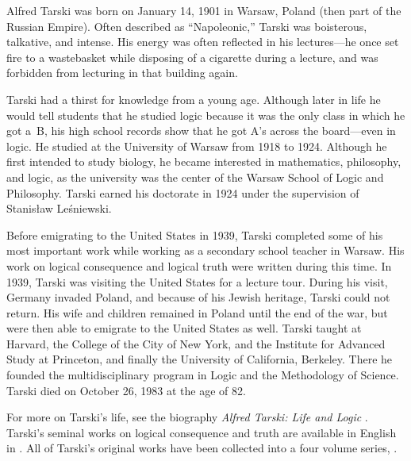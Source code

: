 \documentclass[../../../include/open-logic-section]{subfiles}
\begin{document}



Alfred Tarski was born on January 14, 1901 in Warsaw, Poland (then
part of the Russian Empire). Often described as ``Napoleonic,'' Tarski
was boisterous, talkative, and intense.  His energy was often reflected
in his lectures---he once set fire to a wastebasket while disposing of
a cigarette during a lecture, and was forbidden from lecturing in that
building again.

Tarski had a thirst for knowledge from a young age. Although later in
life he would tell students that he studied logic because it was the
only class in which he got a~B, his high school records show that he
got A's across the board---even in logic. He studied at the University
of Warsaw from 1918 to 1924. Although he first intended to study
biology, he became interested in mathematics, philosophy, and logic,
as the university was the center of the Warsaw School of Logic and
Philosophy. Tarski earned his doctorate in 1924 under the supervision of
Stanis\l{}aw Le\'{s}niewski.

Before emigrating to the United States in 1939, Tarski completed some
of his most important work while working as a secondary school teacher
in Warsaw. His work on logical consequence and logical truth were
written during this time. In 1939, Tarski was visiting the United
States for a lecture tour. During his visit, Germany invaded Poland,
and because of his Jewish heritage, Tarski could not return.  His wife
and children remained in Poland until the end of the war, but were
then able to emigrate to the United States as well.  Tarski taught at
Harvard, the College of the City of New York, and the Institute for
Advanced Study at Princeton, and finally the University of California,
Berkeley. There he founded the multidisciplinary program in Logic and
the Methodology of Science.  Tarski died on October 26, 1983 at the
age of 82.

\begin{reading} 
For more on Tarski's life, see the biography \emph{Alfred Tarski: Life
  and Logic} \citep{Feferman2004}. Tarski's seminal works on logical
consequence and truth are available in English in \citet{Tarski1983}.
All of Tarski's original works have been collected into a four volume
series, \citet{Tarski1981}.
\end{reading}
\end{document}
